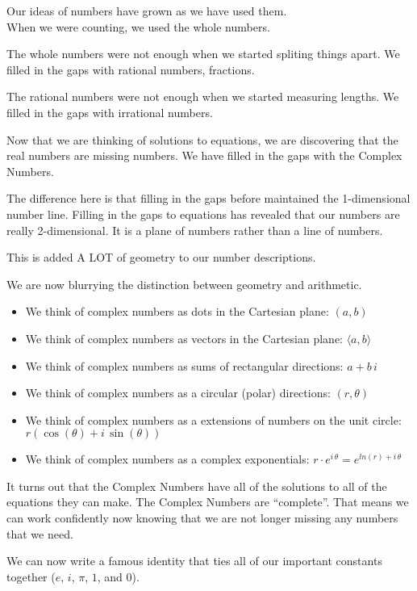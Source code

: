\documentclass{ximera}
\begin{document}
Our ideas of numbers have grown as we have used them. \\

When we were counting, we used the whole numbers.

The whole numbers were not enough when we started spliting things apart.  We filled in the gaps with rational numbers, fractions.

The rational numbers were not enough when we started measuring lengths. We filled in the gaps with irrational numbers.

Now that we are thinking of solutions to equations, we are discovering that the real numbers are missing numbers.  We have filled in the gaps with the Complex Numbers.

The difference here is that filling in the gaps before maintained the 1-dimensional number line.  Filling in the gaps to equations has revealed that our numbers are really 2-dimensional.  It is a plane of numbers rather than a line of numbers.

This is added A LOT of geometry to our number descriptions.

We are now blurrying the distinction between geometry and arithmetic.

\begin{itemize}
\item We think of complex numbers as dots in the Cartesian plane:  $(a, b)$
\item We think of complex numbers as vectors in the Cartesian plane:  $\langle a, b \rangle$
\item We think of complex numbers as sums of rectangular directions:  $a + b \, i$
\item We think of complex numbers as a circular (polar) directions:  $(r, \theta)$
\item We think of complex numbers as a extensions of numbers on the unit circle:  $r(\cos(\theta)+i \, \sin(\theta))$
\item We think of complex numbers as a complex exponentials:  $r\cdot e^{i\, \theta} = e^{ln(r)+i\, \theta}$
\end{itemize}


It turns out that the Complex Numbers have all of the solutions to all of the equations they can make.  The Complex Numbers are ``complete''.  That means we can work confidently now knowing that we are not longer missing any numbers that we need.






We can now write a famous identity that ties all of our important constants together ($e$, $i$, $\pi$, $1$, and $0$).
\end{document}
